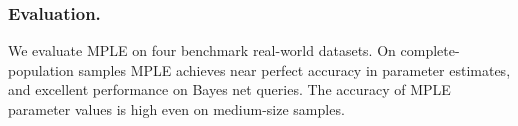 \documentclass[oribibl]{llncs}
\begin{document}
\subsubsection{Evaluation.} We evaluate MPLE on four benchmark real-world datasets.  On complete-population samples MPLE achieves near perfect accuracy in parameter estimates, and excellent performance on Bayes net queries. 
The accuracy of MPLE parameter values is high even on medium-size samples. 


\end{document}
